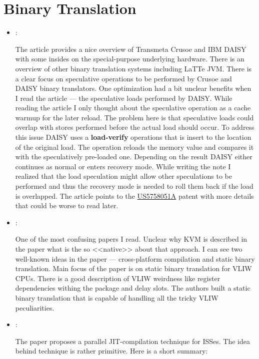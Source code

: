 \section*{Binary Translation}
\begin{itemize}
    \item \cite{Altman:BT-Future:2001}:

    The article provides a nice overview of Transmeta Crusoe and IBM DAISY with some insides on the special-purpose underlying hardware. There is an overview of other binary translation systems including LaTTe JVM. There is a clear focus on speculative operations to be performed by Crusoe and DAISY binary translators. One optimization had a bit unclear benefits when I read the article --- the speculative loads performed by DAISY. While reading the article I only thought about the speculative operation as a cache warmup for the later reload. The problem here is that speculative loads could overlap with stores performed before the actual load should occur. To address this issue DAISY uses a \textbf{load-verify} operations that is insert to the location of the original load. The operation reloads the memory value and compares it with the speculatively pre-loaded one. Depending on the result DAISY either continues as normal or enters recovery mode. While writing the note I realized that the load speculation might allow other speculations to be performed and thus the recovery mode is needed to roll them back if the load is overlapped. The article points to the \href{https://patents.google.com/patent/US5758051A}{US5758051A} patent with more details that could be worse to read later.

    \item \cite{Hamayun:StaticBT-VLIW:2013}:

    One of the most confusing papers I read. Unclear why KVM is described in the paper what is the so <<native>> about that approach. I can see two well-known ideas in the paper --- cross-platform compilation and static binary translation. Main focus of the paper is on static binary translation for VLIW CPUs. There is a good description of VLIW weirdness like register dependencies withing the package and delay slots. The authors built a static binary translation that is capable of handling all the tricky VLIW peculiarities.

    \item \cite{Qin:ParallelJIT:2006}:

    The paper proposes a parallel JIT-compilation technique for ISSes. The idea behind technique is rather primitive. Here is a short summary:


\end{itemize}
